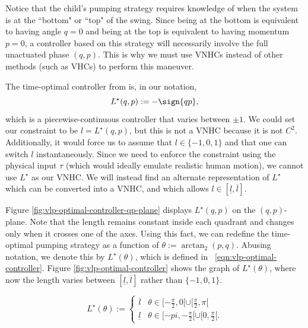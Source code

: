 Notice that the child's pumping strategy requires knowledge of
when the system is at the ``bottom" or ``top" of the swing. 
Since being at the bottom is equivalent to having angle \(q = 0\) and being
at the top is equivalent to having momentum \(p = 0\), a controller based on
this strategy will necessarily involve the full unactuated phase \((q,p)\). 
This is why we must use VNHCs instead of other methods (such as VHCs) 
to perform this maneuver.

The time-optimal controller from \cite{pumping_swing_standing_squatting} is, in
our notation,
\[
   L^\star(q,p) := -\sign{qp}
   ,
\]
which is a piecewise-continuous controller that varies between \(\pm 1\). 
We could set our constraint to be \(l = L^\star(q,p)\), but this is not a VNHC
because it is not \(C^2\).
Additionally, it would force us to assume that \(l \in \{-1,0,1\}\) and that one
can switch \(l\) instantaneously.
Since we need to enforce the constraint using the physical input \(\tau\) (which
would ideally emulate realistic human motion), we cannot use \(L^\star\) as our
VNHC.
We will instead find an alternate representation of \(L^\star\) which can be
converted into a VNHC, and which allows 
\(l \in [\underline{l},\overline{l}]\).

Figure \ref{fig:vlp-optimal-controller-qp-plane} displays \(L^\star(q,p)\) 
on the \((q,p)\)-plane.
Note that the length remains constant inside each quadrant and changes only when it
crosses one of the axes. Using this fact, we can redefine
the time-optimal pumping strategy as a function of 
\(\theta := \arctan_2(p,q)\).
Abusing notation, we denote this by \(L^\star(\theta)\), which is defined in
~\eqref{eqn:vlp-optimal-controller}.
Figure \ref{fig:vlp-optimal-controller} shows the graph of \(L^\star(\theta)\), 
where now the length varies between \([\underline{l},\overline{l}]\) rather than 
\(\{-1,0,1\}\). 

\begin{equation}\label{eqn:vlp-optimal-controller}
   L^\star(\theta):= \begin{cases}
      \overline{l} & \theta \in [-\frac{\pi}{2},0[ \cup [\frac{\pi}{2}, \pi[ \\
      \underline{l} & \theta \in [-pi, -\frac{\pi}{2}[ \cup [0,\frac{\pi}{2}[ 
      .
   \end{cases}
\end{equation}

